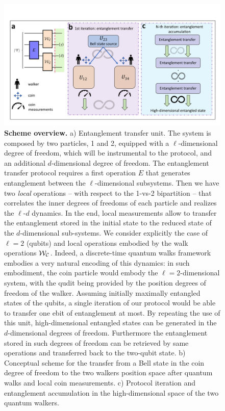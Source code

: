 \documentclass[
	aps, pra,
	superscriptaddress, twocolumn,
	floatfix,
	10pt
]{revtex4-1}
\begin{document}
\begin{figure}[ht]
    \centering
    \includegraphics[width=2\columnwidth]{new_conceptMP.pdf}
    \caption{\textbf{Scheme overview.}
        a) Entanglement transfer unit. The system is composed by two particles, 1 and 2, equipped with a $\ell$-dimensional degree of freedom, which will be instrumental to the protocol, and an additional $d$-dimensional degree of freedom. The entanglement transfer protocol requires a first operation $E$ that generates entanglement between the $\ell$-dimensional subsystems. Then we have two {\it local} operations -- with respect to the 1-vs-2 bipartition -- that correlates the inner degrees of freedoms of each particle and realizes the $\ell$-$d$ dynamics. In the end, local measurements allow to transfer the entanglement stored in the initial state to the reduced state of the $d$-dimensional sub-systems. We consider explicitly the case of $\ell=2$ (qubits) and local operations embodied by the walk operations ${\cal W}_{\cal C}$. Indeed, a discrete-time quantum walks framework embodies a very natural encoding of this dynamics: in such embodiment, the  coin particle would embody the $\ell=2$-dimensional system, with the qudit being provided by the position degrees of freedom of the walker. Assuming initially maximally entangled states of the qubits, a single iteration of our protocol would be able to transfer one ebit of entanglement at most. By repeating the use of this unit, high-dimensional entangled states can be generated in the $d$-dimensional degrees of freedom. Furthermore the entanglement stored in such degrees of freedom can be retrieved by same operations and transferred back to the two-qubit state. %
         b) Conceptual scheme for the transfer from a Bell state in the coin degree of freedom to the two walkers position space after quantum walks and local coin measurements. c) Protocol iteration and entanglement accumulation in the high-dimensional space of the two quantum walkers.}
    \label{fig:conceptual_scheme}
\end{figure}
\end{document}
